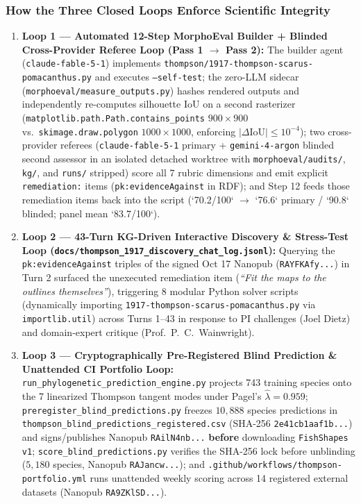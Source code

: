 \documentclass[10.5pt,a4paper]{article}
\newcommand{\code}[1]{{\footnotesize\nolinkurl{#1}}}
\begin{document}
\subsubsection*{How the Three Closed Loops Enforce Scientific Integrity}
\begin{enumerate}
  \setlength{\itemsep}{2pt}
  \item \textbf{Loop 1 — Automated 12-Step MorphoEval Builder + Blinded Cross-Provider Referee Loop (Pass 1 $\to$ Pass 2):} The builder agent (\code{claude-fable-5-1}) implements \code{thompson/1917-thompson-scarus-pomacanthus.py} and executes \texttt{--self-test}; the zero-LLM sidecar (\code{morphoeval/measure_outputs.py}) hashes rendered outputs and independently re-computes silhouette $\mathrm{IoU}$ on a second rasterizer (\code{matplotlib.path.Path.contains_points} $900\times 900$ vs.\ \code{skimage.draw.polygon} $1000\times 1000$, enforcing $|\Delta\mathrm{IoU}| \le 10^{-4}$); two cross-provider referees (\code{claude-fable-5-1} primary + \code{gemini-4-argon} blinded second assessor in an isolated detached worktree with \code{morphoeval/audits/}, \code{kg/}, and \code{runs/} stripped) score all 7 rubric dimensions and emit explicit \texttt{remediation:} items (\texttt{pk:evidenceAgainst} in RDF); and Step 12 feeds those remediation items back into the script (`70.2/100` $\to$ `76.6` primary / `90.8` blinded; panel mean `83.7/100`).
  \item \textbf{Loop 2 — 43-Turn KG-Driven Interactive Discovery \& Stress-Test Loop (\code{docs/thompson_1917_discovery_chat_log.jsonl}):} Querying the \texttt{pk:evidenceAgainst} triples of the signed Oct 17 Nanopub (\code{RAYFKAfy...}) in Turn 2 surfaced the unexecuted remediation item (\emph{``Fit the maps to the outlines themselves''}), triggering 8 modular Python solver scripts (dynamically importing \code{1917-thompson-scarus-pomacanthus.py} via \code{importlib.util}) across Turns 1--43 in response to PI challenges (Joel Dietz) and domain-expert critique (Prof.\ P.\ C.\ Wainwright).
  \item \textbf{Loop 3 — Cryptographically Pre-Registered Blind Prediction \& Unattended CI Portfolio Loop:} \code{run_phylogenetic_prediction_engine.py} projects 743 training species onto the 7 linearized Thompson tangent modes under Pagel's $\hat{\lambda}=0.959$; \code{preregister_blind_predictions.py} freezes $10{,}888$ species predictions in \code{thompson_blind_predictions_registered.csv} (SHA-256 \code{2e41cb1aaf1b...}) and signs/publishes Nanopub \code{RAilN4nb...} \textbf{before} downloading \code{FishShapes v1}; \code{score_blind_predictions.py} verifies the SHA-256 lock before unblinding ($5{,}180$ species, Nanopub \code{RAJancw...}); and \code{.github/workflows/thompson-portfolio.yml} runs unattended weekly scoring across 14 registered external datasets (Nanopub \code{RA9ZKlSD...}).
\end{enumerate}
\end{document}
